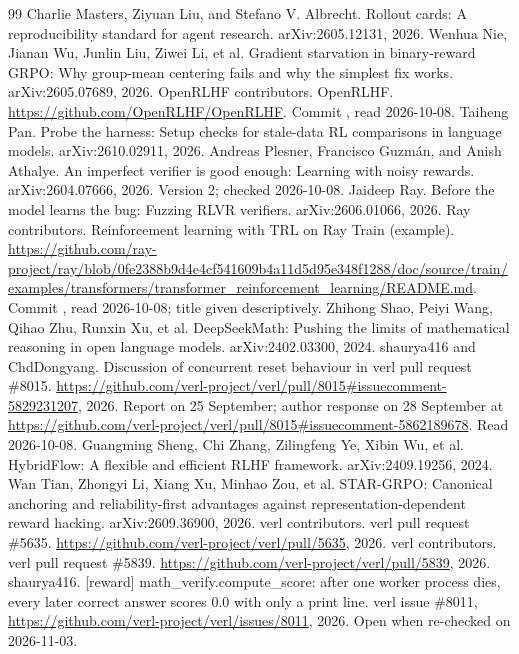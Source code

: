 \documentclass[11pt,a4paper]{article}
\begin{document}
\begin{thebibliography}{99}
 Charlie Masters, Ziyuan Liu, and Stefano V. Albrecht. Rollout cards: A reproducibility standard for agent research. arXiv:2605.12131, 2026.
 Wenhua Nie, Jianan Wu, Junlin Liu, Ziwei Li, et al. Gradient starvation in binary-reward GRPO: Why group-mean centering fails and why the simplest fix works. arXiv:2605.07689, 2026.
 OpenRLHF contributors. OpenRLHF. \url{https://github.com/OpenRLHF/OpenRLHF}. Commit , read 2026-10-08.
 Taiheng Pan. Probe the harness: Setup checks for stale-data RL comparisons in language models. arXiv:2610.02911, 2026.
 Andreas Plesner, Francisco Guzm\'an, and Anish Athalye. An imperfect verifier is good enough: Learning with noisy rewards. arXiv:2604.07666, 2026. Version 2; checked 2026-10-08.
 Jaideep Ray. Before the model learns the bug: Fuzzing RLVR verifiers. arXiv:2606.01066, 2026.
 Ray contributors. Reinforcement learning with TRL on Ray Train (example). \url{https://github.com/ray-project/ray/blob/0fe2388b9d4e4cf541609b4a11d5d95e348f1288/doc/source/train/examples/transformers/transformer_reinforcement_learning/README.md}. Commit , read 2026-10-08; title given descriptively.
 Zhihong Shao, Peiyi Wang, Qihao Zhu, Runxin Xu, et al. DeepSeekMath: Pushing the limits of mathematical reasoning in open language models. arXiv:2402.03300, 2024.
 shaurya416 and ChdDongyang. Discussion of concurrent reset behaviour in verl pull request \#8015. \url{https://github.com/verl-project/verl/pull/8015\#issuecomment-5829231207}, 2026. Report on 25 September; author response on 28 September at \url{https://github.com/verl-project/verl/pull/8015\#issuecomment-5862189678}. Read 2026-10-08.
 Guangming Sheng, Chi Zhang, Zilingfeng Ye, Xibin Wu, et al. HybridFlow: A flexible and efficient RLHF framework. arXiv:2409.19256, 2024.
 Wan Tian, Zhongyi Li, Xiang Xu, Minhao Zou, et al. STAR-GRPO: Canonical anchoring and reliability-first advantages against representation-dependent reward hacking. arXiv:2609.36900, 2026.
 verl contributors. verl pull request \#5635. \url{https://github.com/verl-project/verl/pull/5635}, 2026.
 verl contributors. verl pull request \#5839. \url{https://github.com/verl-project/verl/pull/5839}, 2026.
 shaurya416. [reward] math\_verify.compute\_score: after one worker process dies, every later correct answer scores 0.0 with only a print line. verl issue \#8011, \url{https://github.com/verl-project/verl/issues/8011}, 2026. Open when re-checked on 2026-11-03.

\end{thebibliography}
\end{document}
